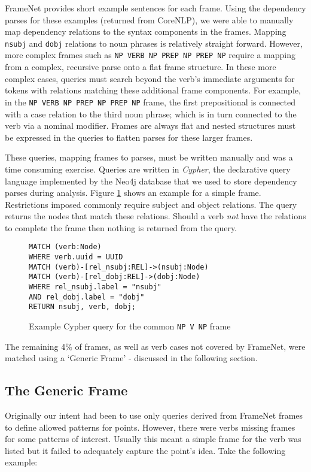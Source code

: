      FrameNet provides short example sentences for each frame. Using the dependency parses for these examples (returned from CoreNLP), we were able to manually map dependency relations to the syntax components in the frames. Mapping \texttt{nsubj} and \texttt{dobj} relations to noun phrases is relatively straight forward. However, more complex frames such as \texttt{NP VERB NP PREP NP PREP NP} require a mapping from a complex, recursive parse onto a flat frame structure. In these more complex cases, queries must search beyond the verb's immediate arguments for tokens with relations matching these additional frame components. For example, in the \texttt{NP VERB NP PREP NP PREP NP} frame, the first prepositional is connected with a case relation to the third noun phrase; which is in turn connected to the verb via a nominal modifier. Frames are always flat and nested structures must be expressed in the queries to flatten parses for these larger frames.

      These queries, mapping frames to parses, must be written manually and was a time consuming exercise. Queries are written in \textit{Cypher}, the declarative query language implemented by the Neo4j database that we used to store dependency parses during analysis. Figure \ref{fig:npvnpquery} shows an example for a simple frame. Restrictions imposed commonly require subject and object relations. The query returns the nodes that match these relations. Should a verb \textit{not} have the relations to complete the frame then nothing is returned from the query.

      \begin{figure}
        \centering
        \caption{Example Cypher query for the common \texttt{NP V NP} frame}

        \begin{verbatim}
MATCH (verb:Node)
WHERE verb.uuid = UUID
MATCH (verb)-[rel_nsubj:REL]->(nsubj:Node)
MATCH (verb)-[rel_dobj:REL]->(dobj:Node)
WHERE rel_nsubj.label = "nsubj"
AND rel_dobj.label = "dobj"
RETURN nsubj, verb, dobj;
        \end{verbatim}
        \label{fig:npvnpquery}
      \end{figure}

      The remaining 4\% of frames, as well as verb cases not covered by FrameNet, were matched using a `Generic Frame' - discussed in the following section.

    \tocless\subsection{The Generic Frame}
      Originally our intent had been to use only queries derived from FrameNet frames to define allowed patterns for points. However, there were verbs missing frames for some patterns of interest. Usually this meant a simple frame for the verb was listed but it failed to adequately capture the point's idea. Take the following example:

